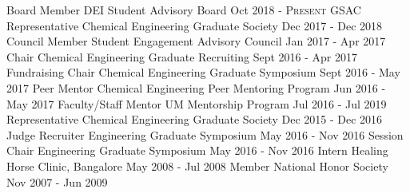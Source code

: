 \begin{cvhonors}[1.5cm]
  \cvhonor
    {Board Member} %
    {DEI Student Advisory Board} %
    {} %
    {Oct 2018 - \textsc{Present}} %
  \cvhonor
    {GSAC Representative} %
    {Chemical Engineering Graduate Society} %
    {} %
    {Dec 2017 - Dec 2018} %
\ifextended
  \cvhonor
    {Council Member} %
    {Student Engagement Advisory Council} %
    {} %
    {Jan 2017 - Apr 2017} %
\fi
  \cvhonor
    {Chair} %
    {Chemical Engineering Graduate Recruiting} %
    {} %
    {Sept 2016 - Apr 2017} %
  \cvhonor
    {Fundraising Chair} %
    {Chemical Engineering Graduate Symposium} %
    {} %
    {Sept 2016 - May 2017} %
  \cvhonor
    {Peer Mentor} %
    {Chemical Engineering Peer Mentoring Program} %
    {} %
    {Jun 2016 - May 2017} %
  \cvhonor
    {Faculty/Staff Mentor} %
    {UM Mentorship Program} %
    {} %
    {Jul 2016 - Jul 2019} %
\ifextended
  \cvhonor
    {Representative} %
    {Chemical Engineering Graduate Society} %
    {} %
    {Dec 2015 - Dec 2016} %
  \cvhonor
    {Judge Recruiter} %
    {Engineering Graduate Symposium} %
    {} %
    {May 2016 - Nov 2016} %
  \cvhonor
    {Session Chair} %
    {Engineering Graduate Symposium} %
    {} %
    {May 2016 - Nov 2016} %
\fi
\ifoutdated
  \cvhonor
    {Intern} %
    {Healing Horse Clinic, Bangalore} %
    {} %
    {May 2008 - Jul 2008} %
  \cvhonor
    {Member} %
    {National Honor Society} %
    {} %
    {Nov 2007 - Jun 2009} %
\fi
\end{cvhonors}
